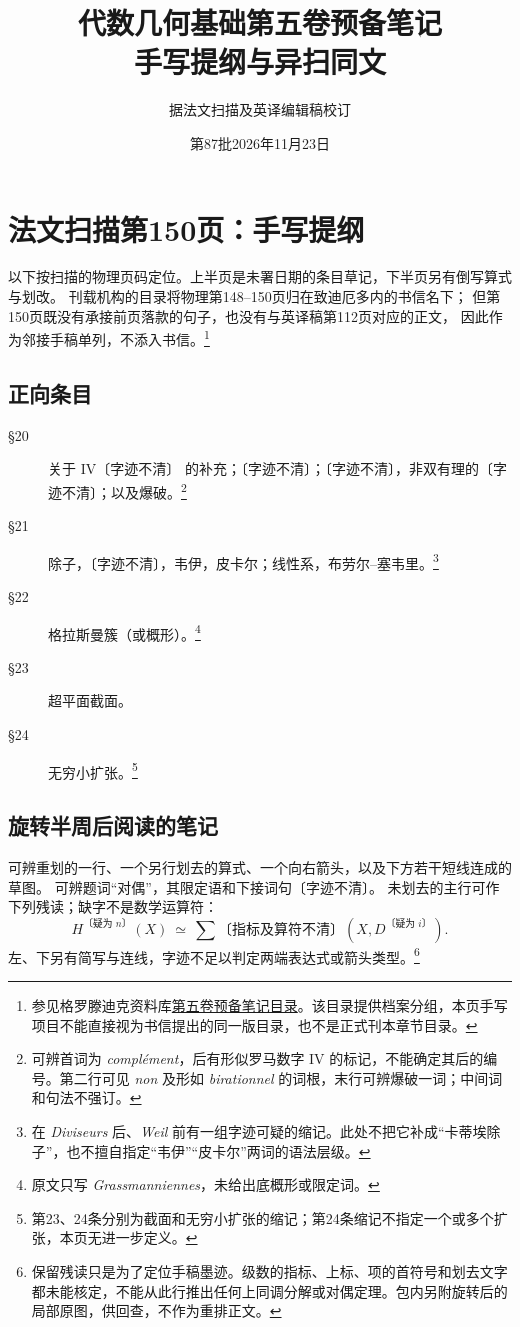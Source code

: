 \documentclass[openany,fontset=fandol]{ctexbook}
\newcommand{\illis}{〔字迹不清〕}
\begin{document}
\title{代数几何基础第五卷预备笔记\\手写提纲与异扫同文}
\author{据法文扫描及英译编辑稿校订}
\date{第87批\quad 2026年11月23日}
\maketitle

\chapter*{法文扫描第150页：手写提纲}

\noindent 以下按扫描的物理页码定位。上半页是未署日期的条目草记，下半页另有倒写算式与划改。
刊载机构的目录将物理第148--150页归在致迪厄多内的书信名下；
但第150页既没有承接前页落款的句子，也没有与英译稿第112页对应的正文，
因此作为邻接手稿单列，不添入书信。\footnote{参见格罗滕迪克资料库\href{https://webusers.imj-prg.fr/~leila.schneps/grothendieckcircle/EGA/EGAVcontents.pdf}{第五卷预备笔记目录}。该目录提供档案分组，本页手写项目不能直接视为书信提出的同一版目录，也不是正式刊本章节目录。}

\section*{正向条目}
\begin{description}
 \item[\S20] 关于 IV\illis{} 的补充；\illis{}；\illis{}，非双有理的\illis{}；以及爆破。\footnote{可辨首词为 \emph{complément}，后有形似罗马数字 IV 的标记，不能确定其后的编号。第二行可见 \emph{non} 及形如 \emph{birationnel} 的词根，末行可辨爆破一词；中间词和句法不强订。}
 \item[\S21] 除子，\illis{}，韦伊，皮卡尔；线性系，布劳尔--塞韦里。\footnote{在 \emph{Diviseurs} 后、\emph{Weil} 前有一组字迹可疑的缩记。此处不把它补成“卡蒂埃除子”，也不擅自指定“韦伊”“皮卡尔”两词的语法层级。}
 \item[\S22] 格拉斯曼簇（或概形）。\footnote{原文只写 \emph{Grassmanniennes}，未给出底概形或限定词。}
 \item[\S23] 超平面截面。
 \item[\S24] 无穷小扩张。\footnote{第23、24条分别为截面和无穷小扩张的缩记；第24条缩记不指定一个或多个扩张，本页无进一步定义。}
\end{description}

\section*{旋转半周后阅读的笔记}
可辨重划的一行、一个另行划去的算式、一个向右箭头，以及下方若干短线连成的草图。
可辨题词“对偶”，其限定语和下接词句\illis{}。
未划去的主行可作下列残读；缺字不是数学运算符：
\[
 H^{\text{〔疑为 }n\text{〕}}(X)\ \simeq\ \sum
       \text{〔指标及算符不清〕}(X,D^{\text{〔疑为 }i\text{〕}}).
\]
左、下另有简写与连线，字迹不足以判定两端表达式或箭头类型。\footnote{保留残读只是为了定位手稿墨迹。级数的指标、上标、项的首符号和划去文字都未能核定，不能从此行推出任何上同调分解或对偶定理。包内另附旋转后的局部原图，供回查，不作为重排正文。}
\end{document}
